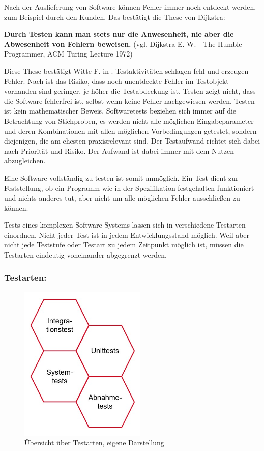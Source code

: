 \documentclass[a4paper,titlepage,halfparskip,12pt]{scrreprt}
\begin{document}
\begin{onehalfspacing}
Nach der Auslieferung von Software können Fehler immer noch entdeckt werden, zum Beispiel durch den Kunden. Das bestätigt die These von Dijkstra:

\smallskip

\textbf{\glqq Durch Testen kann man stets nur die Anwesenheit, nie aber die Abwesenheit von Fehlern beweisen.\grqq} (vgl. Dijkstra E. W. - The Humble Programmer, ACM Turing Lecture 1972)

\smallskip

Diese These bestätigt Witte F. in \cite{witte2019testmanagement}. Testaktivitäten schlagen fehl und erzeugen Fehler. Nach \cite{witte2019testmanagement} ist das Risiko, dass noch unentdeckte Fehler im Testobjekt vorhanden sind geringer, je höher die Testabdeckung ist. Testen zeigt nicht, dass die Software fehlerfrei ist, selbst wenn keine Fehler nachgewiesen werden. Testen ist kein mathematischer Beweis. Softwaretests beziehen sich immer auf die Betrachtung von Stichproben, es werden nicht alle möglichen Eingabeparameter und deren Kombinationen mit allen möglichen Vorbedingungen getestet, sondern diejenigen, die am ehesten praxisrelevant sind. Der Testaufwand richtet sich dabei nach Priorität und Risiko. Der Aufwand ist dabei immer mit
dem Nutzen abzugleichen. 

\smallskip

Eine Software vollständig zu testen ist somit unmöglich. Ein Test dient zur Feststellung, ob ein Programm wie in der Spezifikation festgehalten
funktioniert und nichts anderes tut, aber nicht um alle möglichen Fehler ausschließen zu können.

\smallskip

Tests eines komplexen Software-Systems lassen sich in verschiedene Testarten einordnen. Nicht jeder Test ist in jedem Entwicklungsstand möglich. Weil aber nicht jede Teststufe oder Testart zu jedem Zeitpunkt möglich ist, müssen die Testarten eindeutig voneinander abgegrenzt werden.

\subsubsection*{Testarten:}

\begin{figure}[h]
	\centering
	\includegraphics[width=6cm]{images/Testarten.png}
	\caption{Übersicht über Testarten, eigene Darstellung}
	\label{img:Testarten}
\end{figure}


\end{onehalfspacing}
\end{document}
